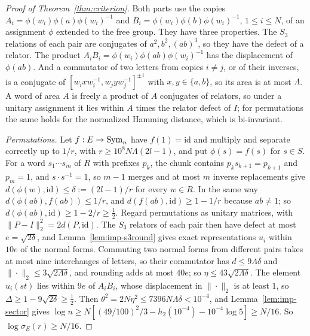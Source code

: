 \begin{proof}[Proof of Theorem~\ref{thm:criterion}]
Both parts use the copies $A_i=\phi(w_i)\phi(a)\phi(w_i)^{-1}$ and $B_i=\phi(w_i)\phi(b)\phi(w_i)^{-1}$, $1\le i\le N$, of an assignment $\phi$ extended
to the free group. They have three properties. The $S_3$ relations of each pair are conjugates of $a^2,b^2,(ab)^3$, so they have the defect of a
relator. The product $A_iB_i=\phi(w_i)\phi(ab)\phi(w_i)^{-1}$ has the displacement of $\phi(ab)$. And a commutator of two letters from copies
$i\ne j$, or of their inverses, is a conjugate of $[w_ixw_i^{-1},w_jyw_j^{-1}]^{\pm1}$ with $x,y\in\{a,b\}$, so its area is at most $\Lambda$. A
word of area $A$ is freely a product of $A$ conjugates of relators, so under a unitary assignment it lies within $A$ times the relator defect of
$I$; for permutations the same holds for the normalized Hamming distance, which is bi-invariant.

\emph{Permutations.} Let $f:E\to\operatorname{Sym}_n$ have $f(1)=\mathrm{id}$ and multiply and separate correctly up to $1/r$, with $r\ge10^8N\Lambda(2l-1)$, and put
$\phi(s)=f(s)$ for $s\in S$. For a word $s_1\cdots s_m$ of $R$ with prefixes $p_k$, the chunk contains $p_ks_{k+1}=p_{k+1}$ and $p_m=1$, and
$s\cdot s^{-1}=1$, so $m-1$ merges and at most $m$ inverse replacements give $d(\phi(w),\mathrm{id})\le\delta:=(2l-1)/r$ for every $w\in R$. In the
same way $d(\phi(ab),f(ab))\le1/r$, and $d(f(ab),\mathrm{id})\ge1-1/r$ because $ab\ne1$; so $d(\phi(ab),\mathrm{id})\ge1-2/r\ge\frac12$. Regard
permutations as unitary matrices, with $\|P-I\|_2^2=2d(P,\mathrm{id})$. The $S_3$ relators of each pair then have defect at most $e=\sqrt{2\delta}$,
and Lemma~\ref{lem:imp-s3round} gives exact representations $u_i$ within $10e$ of the normal forms. Commuting two normal forms from different
pairs takes at most nine interchanges of letters, so their commutator has $d\le9\Lambda\delta$ and $\|\cdot\|_2\le3\sqrt{2\Lambda\delta}$, and rounding adds at
most $40e$; so $\eta\le43\sqrt{2\Lambda\delta}$. The element $u_i(st)$ lies within $9e$ of $A_iB_i$, whose displacement in $\|\cdot\|_2$ is at least $1$,
so $\Delta\ge1-9\sqrt{2\delta}\ge\frac12$. Then $\theta^2=2N\eta^2\le7396N\Lambda\delta<10^{-4}$, and Lemma~\ref{lem:imp-sector} gives
$\log n\ge N[(49/100)^2/3-h_2(10^{-4})-10^{-4}\log5]\ge N/16$. So $\log\sigma_E(r)\ge N/16$.


\end{proof}
